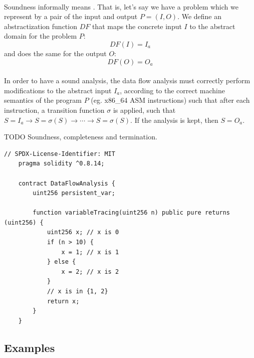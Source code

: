 \paragraph*{}
Soundness informally means \cite[that the flow functions map abstract information before each instruction to abstract information after that instruction in a way that matches the instruction's concrete semantics]{program-analysis-corectness-cmu}. That is, let's say we have a problem which we represent by a pair of the input and output $P=(I, O)$. We define an abstractization function $DF$ that maps the concrete input $I$ to the abstract domain for the problem $P$:
$$DF(I) = I_a$$
and does the same for the output $O$:
$$DF(O) = O_a$$

\paragraph*{}
In order to have a sound analysis, the data flow analysis must correctly perform modifications to the abstract input $I_a$, according to the correct machine semantics of the program $P$ (eg. x86\_64 ASM instructions) such that after each instruction, a transition function $\sigma$ is applied, such that $S = I_a \rightarrow S = \sigma(S) \rightarrow \cdots \rightarrow S = \sigma(S)$. If the analysis is kept, then $S=O_a$.


TODO Soundness, completeness and termination.

\begin{lstlisting}[language=Solidity, caption={Simple example of how data flow analysis is used to trace the values of a variable through the execution flow.}]
    // SPDX-License-Identifier: MIT
    pragma solidity ^0.8.14;
    
    contract DataFlowAnalysis {
        uint256 persistent_var;
    
        function variableTracing(uint256 n) public pure returns (uint256) {
            uint256 x; // x is 0
            if (n > 10) {
                x = 1; // x is 1
            } else {
                x = 2; // x is 2
            }
            // x is in {1, 2}
            return x;
        }
    }    
\end{lstlisting}

\subsection{Examples}
